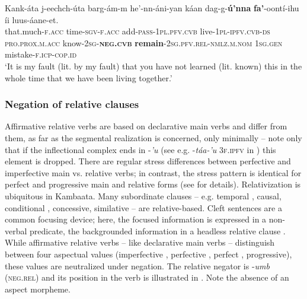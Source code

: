 \documentclass[output=paper,colorlinks,citecolor=brown,draftmode
]{langscibook}
\begin{document}

\ea\label{ex:treis:21} 
\gll Kank-áta				j-eechch-úta		barg-ám-m 			he’-nn-áni-yan káan					dag-g-\textbf{ú’nna}		\textbf{fa’}-oontí-ihu\footnotemark{} íi			luus-áane-et.\\
that.much-\textsc{f.acc} 	time-\textsc{sgv-f.acc}	add-\textsc{pass-1pl.pfv.cvb}	live-\textsc{1pl-ipfv.cvb-ds} \textsc{pro.prox.m.acc}	know-\textsc{2sg-\textbf{neg.cvb}}	\textbf{remain}-\textsc{2sg.pfv.rel-nmlz.m.nom} \textsc{1sg.gen} mistake-\textsc{f.icp-cop.id}\\
\glt ‘It is my fault (lit. by my fault) that you have not learned (lit. known) this in the whole time that we have been living together.’ \citep[34]{Saint-Exupéry2018}
\z 
{} 

\subsubsection{Negation of relative clauses}\label{sec:treis:2.4.2}

Affirmative relative verbs are based on declarative main verbs and differ from them, as far as the segmental realization is concerned, only minimally -- note only that if the inflectional complex ends in -\textit{’u} (see e.g. -\textit{táa-’u} \textsc{3f.ipfv} in ) this element is dropped. There are regular stress differences between perfective and imperfective main vs. relative verbs; in contrast, the stress pattern is identical for perfect and progressive main and relative forms (see \citealt{Treis2012a} for details). Relativization is ubiquitous in Kambaata. Many subordinate clauses -- e.g. temporal , causal, conditional , concessive, similative  -- are relative-based. Cleft sentences are a common focusing device; here, the focused information is expressed in a non-verbal predicate, the backgrounded information in a headless relative clause . While affirmative relative verbs – like declarative main verbs – distinguish between four aspectual values (imperfective , perfective , perfect , progressive), these values are neutralized under negation. 
The relative negator is -\textit{umb} (\textsc{neg.rel}) and its position in the verb is illustrated in . Note the absence of an aspect morpheme.
\end{document}
